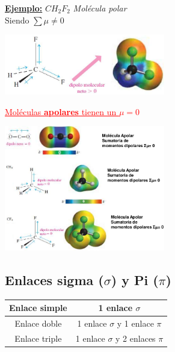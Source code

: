         \textbf{\underline{Ejemplo:}} $CH_2F_2$ \textit{Molécula polar} \\[2mm] Siendo $\sum \mu \neq 0$
        \begin{center} \includegraphics[width=7cm]{./imagenes/momentoDipolarCH2F2.png} \end{center}
        \saltoPag%
        \begin{center} \textcolor{red}{\underline{Moléculas \textbf{apolares} tienen un $\mu = 0$}} \end{center}
        \begin{center} \includegraphics[width=7cm]{./imagenes/momentoDipolarMoleculasApolares.png} \end{center}
    \subsection{Enlaces sigma ($\sigma$) y Pi ($\pi$)}
        \begin{tabular}{| c | c |}
            \toprule 
            Enlace simple & 1 enlace $\sigma$ \\
            \midrule
            Enlace doble & 1 enlace $\sigma$ y 1 enlace $\pi$ \\
            \midrule
            Enlace triple & 1 enlace $\sigma$ y 2 enlaces $\pi$ \\
            \bottomrule
        \end{tabular}

